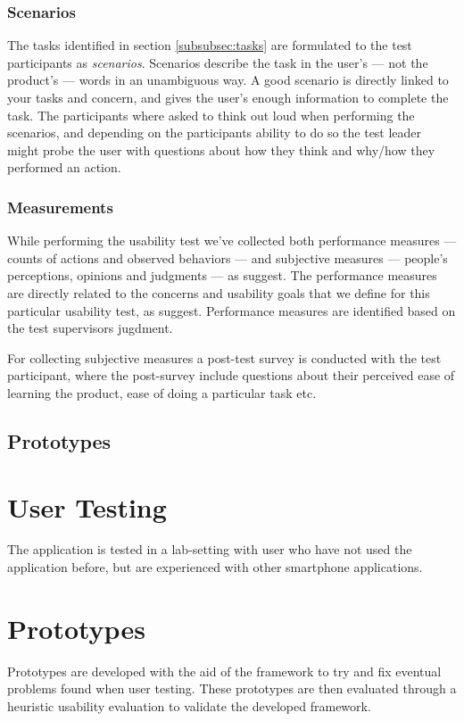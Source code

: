 \subsubsection{Scenarios}
The tasks identified in section \ref{subsubsec:tasks} are formulated to the test participants as \textit{scenarios}. Scenarios describe the task in the user's --- not the product's --- words in an unambiguous way. A good scenario is directly linked to your tasks and concern, and gives the user's enough information to complete the task. The participants where asked to think out loud when performing the scenarios, and depending on the participants ability to do so the test leader might probe the user with questions about how they think and why/how they performed an action.

\subsubsection{Measurements}
\label{subsubsec:measurements}
While performing the usability test we've collected both performance measures --- counts of actions and observed behaviors --- and subjective measures --- people's perceptions, opinions and judgments --- as \cite{Dumas1999} suggest.
The performance measures are directly related to the concerns and usability goals that we define for this particular usability test, as \cite{Dumas1999} suggest. Performance measures are identified based on the test supervisors jugdment.

For collecting subjective measures a post-test survey is conducted with the test participant, where the post-survey include questions about their perceived ease of learning the product, ease of doing a particular task etc.

\subsection{Prototypes}

\section{User Testing}
The application is tested in a lab-setting with user who have not used the application before, but are experienced with other smartphone applications. 

\section{Prototypes}
%
Prototypes are developed with the aid of the framework to try and fix eventual problems found when user testing. These prototypes are then evaluated through a heuristic usability evaluation to validate the developed framework.
